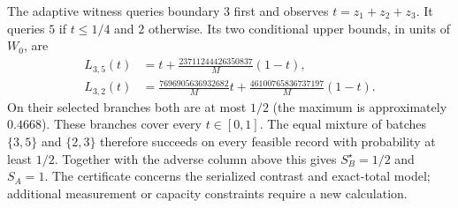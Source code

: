 The adaptive witness queries boundary $3$ first and observes
$t=z_1+z_2+z_3$. It queries $5$ if $t\leq1/4$ and $2$ otherwise.
Its two conditional upper bounds, in units of $W_0$, are
\[
 \begin{aligned}
 L_{3,5}(t)&=t+\frac{23711244426350837}{M}(1-t),\\
 L_{3,2}(t)&=\frac{7696905636932682}{M}t+
                    \frac{46100765836737197}{M}(1-t).
 \end{aligned}
\]
On their selected branches both are at most $1/2$ (the maximum is
approximately $0.4668$). These branches cover every $t\in[0,1]$.
The equal mixture of batches $\{3,5\}$ and $\{2,3\}$ therefore succeeds
on every feasible record with probability at least $1/2$. Together with
the adverse column above this gives $S_B^\star=1/2$ and $S_A=1$.
The certificate concerns the serialized contrast and exact-total model;
additional measurement or capacity constraints require a new calculation.

